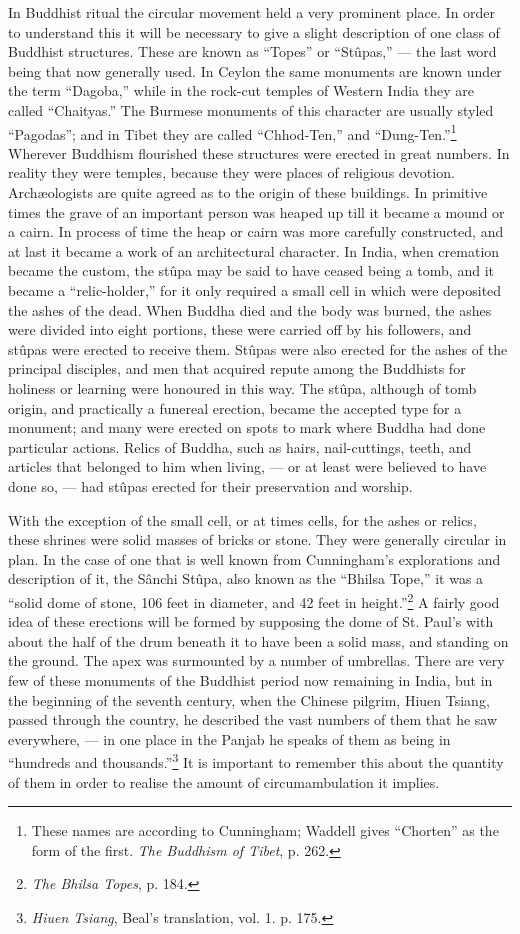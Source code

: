 \documentclass[a4paper, 11pt, oneside, polutonikogreek, english]{article}
\begin{document}
In Buddhist ritual the circular movement held a very prominent place. In order to understand this it will be necessary to give a slight description of one class of Buddhist structures. These are known as ``Topes'' or ``Stûpas,'' --- the last word being that now generally used. In Ceylon the same monuments are known under the term ``Dagoba,'' while in the rock-cut temples of Western India they are called ``Chaityas.'' The Burmese monuments of this character are usually styled ``Pagodas''; and in Tibet they are called ``Chhod-Ten,'' and ``Dung-Ten.''\footnote{These names are according to Cunningham; Waddell gives ``Chorten'' as the form of the first. \emph{The Buddhism of Tibet}, p. 262.} Wherever Buddhism flourished these structures were erected in great numbers. In reality they were temples, because they were places of religious devotion. Archæologists are quite agreed as to the origin of these buildings. In primitive times the grave of an important person was heaped up till it became a mound or a cairn. In process of time the heap or cairn was more carefully constructed, and at last it became a work of an architectural character. In India, when cremation became the custom, the stûpa may be said to have ceased being a tomb, and it became a ``relic-holder,'' for it only required a small cell in which were deposited the ashes of the dead. When Buddha died and the body was burned, the ashes were divided into eight portions, these were carried off by his followers, and stûpas were erected to receive them. Stûpas were also erected for the ashes of the principal disciples, and men that acquired repute among the Buddhists for holiness or learning were honoured in this way. The stûpa, although of tomb origin, and practically a funereal erection, became the accepted type for a monument; and many were erected on spots to mark where Buddha had done particular actions. Relics of Buddha, such as hairs, nail-cuttings, teeth, and articles that belonged to him when living, --- or at least were believed to have done so, --- had stûpas erected for their preservation and worship.

With the exception of the small cell, or at times cells, for the ashes or relics, these shrines were solid masses of bricks or stone. They were generally circular in plan. In the case of one that is well known from Cunningham's explorations and description of it, the Sânchi Stûpa, also known as the ``Bhilsa Tope,'' it was a ``solid dome of stone, 106 feet in diameter, and 42 feet in height.''\footnote{\emph{The Bhilsa Topes}, p. 184.} A fairly good idea of these erections will be formed by supposing the dome of St. Paul's with about the half of the drum beneath it to have been a solid mass, and standing on the ground. The apex was surmounted by a number of umbrellas. There are very few of these monuments of the Buddhist period now remaining in India, but in the beginning of the seventh century, when the Chinese pilgrim, Hiuen Tsiang, passed through the country, he described the vast numbers of them that he saw everywhere, --- in one place in the Panjab he speaks of them as being in ``hundreds and thousands.''\footnote{\emph{Hiuen Tsiang}, Beal's translation, vol. 1. p. 175.} It is important to remember this about the quantity of them in order to realise the amount of circumambulation it implies.
\end{document}
